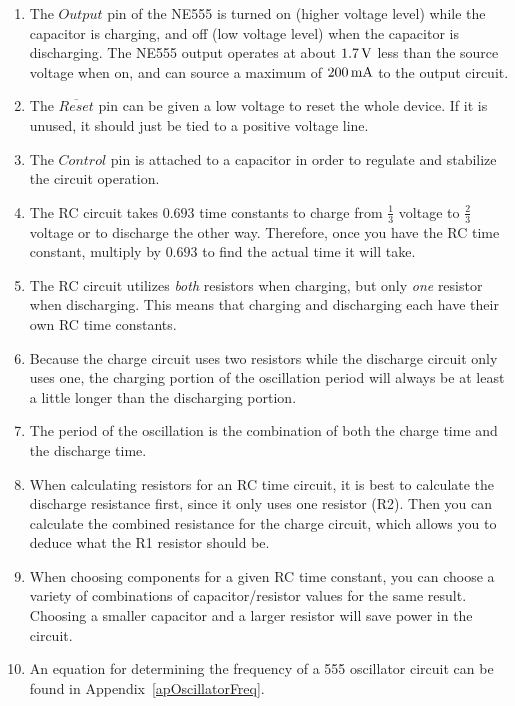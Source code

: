 \begin{enumerate}
\item The $Output$ pin of the NE555 is turned on (higher voltage level) while the capacitor is charging, and off (low voltage level) when the capacitor is discharging.  The NE555 output operates at about $1.7\,\si{\volt}$ less than the source voltage when on, and can source a maximum of $200\,\si{\milli\ampere}$ to the output circuit.
\item The $\overline{Reset}$ pin can be given a low voltage to reset the whole device.  If it is unused, it should just be tied to a positive voltage line.
\item The $Control$ pin is attached to a capacitor in order to regulate and stabilize the circuit operation.
\item The RC circuit takes $0.693$ time constants to charge from $\frac{1}{3}$ voltage to $\frac{2}{3}$ voltage or to discharge the other way.  Therefore, once you have the RC time constant, multiply by $0.693$ to find the actual time it will take.
\item The RC circuit utilizes \emph{both} resistors when charging, but only \emph{one} resistor when discharging.  This means that charging and discharging each have their own RC time constants.
\item Because the charge circuit uses two resistors while the discharge circuit only uses one, the charging portion of the oscillation period will always be at least a little longer than the discharging portion.
\item The period of the oscillation is the combination of both the charge time and the discharge time.
\item When calculating resistors for an RC time circuit, it is best to calculate the discharge resistance first, since it only uses one resistor (R2).  Then you can calculate the combined resistance for the charge circuit, which allows you to deduce what the R1 resistor should be.
\item When choosing components for a given RC time constant, you can choose a variety of combinations of capacitor/resistor values for the same result.  Choosing a smaller capacitor and a larger resistor will save power in the circuit.
\item An equation for determining the frequency of a 555 oscillator circuit can be found in Appendix~\ref{apOscillatorFreq}.
\end{enumerate}

\applysection

